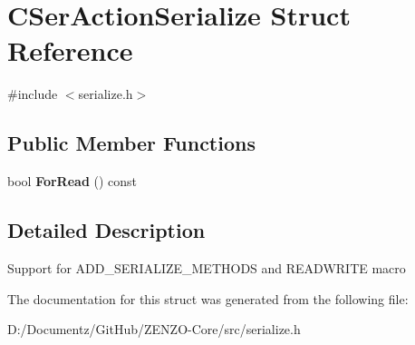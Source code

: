\hypertarget{struct_c_ser_action_serialize}{}\section{C\+Ser\+Action\+Serialize Struct Reference}
\label{struct_c_ser_action_serialize}


{\ttfamily \#include $<$serialize.\+h$>$}

\subsection*{Public Member Functions}
\begin{DoxyCompactItemize}
\item 
\mbox{\label{struct_c_ser_action_serialize_a3facaa35d0ba0b175c647b5409d2bde8}} 
bool {\bfseries For\+Read} () const
\end{DoxyCompactItemize}


\subsection{Detailed Description}
Support for A\+D\+D\+\_\+\+S\+E\+R\+I\+A\+L\+I\+Z\+E\+\_\+\+M\+E\+T\+H\+O\+DS and R\+E\+A\+D\+W\+R\+I\+TE macro 

The documentation for this struct was generated from the following file\+:\begin{DoxyCompactItemize}
\item 
D\+:/\+Documentz/\+Git\+Hub/\+Z\+E\+N\+Z\+O-\/\+Core/src/serialize.\+h\end{DoxyCompactItemize}
